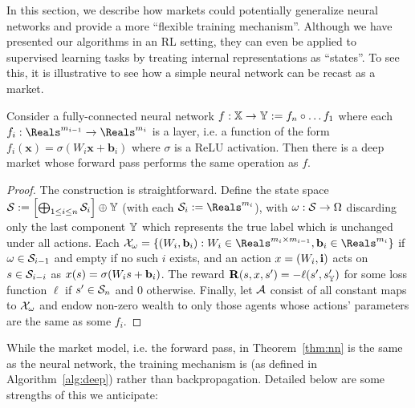 


In this section, we describe how markets could potentially generalize neural networks and provide a more ``flexible training mechanism''. Although we have presented our algorithms in an RL setting, they can even be applied to supervised learning tasks by treating internal representations as ``states''. To see this, it is illustrative to see how a simple neural network can be recast as a market.

\begin{theorem}
  Consider a fully-connected neural network $f:\mathbb{X}\to\mathbb{Y}:=f_n\circ\dots f_1$ where each $f_i:\Reals^{m_{i-1}}\to\Reals^{m_i}$ is a layer, i.e. a function of the form $f_i(\mathbf{x})=\sigma(W_i\mathbf{x}+\mathbf{b}_i)$ where $\sigma$ is a ReLU activation. Then there is a deep market whose forward pass performs the same operation as $f$.
  \label{thm:nn}
\end{theorem}
\begin{proof}
  The construction is straightforward. Define the state space $\mathcal{S}:=\left[\bigoplus_{1\le i\le n}\mathcal{S}_i\right]\oplus\mathbb{Y}$ (with each $\statevecs_i:=\Reals^{m_i}$), with $\omega:\mathcal{S}\to\Omega$ discarding only the last component $\mathbb{Y}$ which represents the true label which is unchanged under all actions. Each $\actions_{\obs}=\{(W_i,\mathbf{b}_i):W_i\in\Reals^{m_i\times m_{i-1}}, \mathbf{b}_i\in\Reals^{m_i}\}$ if $\omega\in\mathcal{S}_{i-1}$ and empty if no such $i$ exists, and an action $x=(W_i,\mathbf{i})$ acts on $s\in\mathcal{S}_{i-i}$ as $x(s)=\sigma(W_is+\mathbf{b}_i)$. The reward $\mathbf{R}(s,x,s')=-\ell(s',s'_{\mathbb{Y}})$ for some loss function $\ell$ if $s'\in\mathcal{S}_n$ and $0$ otherwise. Finally, let $\mathcal{A}$ consist of all constant maps to $\mathcal{X}_\omega$ and endow non-zero wealth to only those agents whose actions' parameters are the same as some $f_i$.
\end{proof}

While the market model, i.e. the forward pass, in Theorem~\ref{thm:nn} is the same as the neural network, the training mechanism is  (as defined in Algorithm~\ref{alg:deep}) rather than backpropagation. Detailed below are some strengths of this we anticipate:

